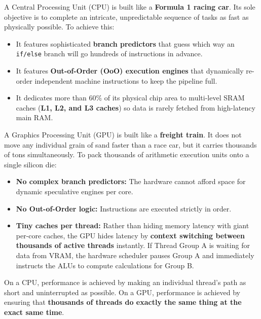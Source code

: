 \documentclass[a4paper,11pt]{article}
\begin{document}
A Central Processing Unit (CPU) is built like a \textbf{Formula 1 racing car}. Its sole objective is to complete an intricate, unpredictable sequence of tasks as fast as physically possible. To achieve this:
\begin{itemize}[leftmargin=1.5em]
  \item It features sophisticated \textbf{branch predictors} that guess which way an \texttt{if/else} branch will go hundreds of instructions in advance.
  \item It features \textbf{Out-of-Order (OoO) execution engines} that dynamically re-order independent machine instructions to keep the pipeline full.
  \item It dedicates more than $60\%$ of its physical chip area to multi-level SRAM caches (\textbf{L1, L2, and L3 caches}) so data is rarely fetched from high-latency main RAM.
\end{itemize}

A Graphics Processing Unit (GPU) is built like a \textbf{freight train}. It does not move any individual grain of sand faster than a race car, but it carries thousands of tons simultaneously. To pack thousands of arithmetic execution units onto a single silicon die:
\begin{itemize}[leftmargin=1.5em]
  \item \textbf{No complex branch predictors:} The hardware cannot afford space for dynamic speculative engines per core.
  \item \textbf{No Out-of-Order logic:} Instructions are executed strictly in order.
  \item \textbf{Tiny caches per thread:} Rather than hiding memory latency with giant per-core caches, the GPU hides latency by \textbf{context switching between thousands of active threads} instantly. If Thread Group A is waiting for data from VRAM, the hardware scheduler pauses Group A and immediately instructs the ALUs to compute calculations for Group B.
\end{itemize}

\begin{conceptbox}
On a CPU, performance is achieved by making an individual thread's path as short and uninterrupted as possible. On a GPU, performance is achieved by ensuring that \textbf{thousands of threads do exactly the same thing at the exact same time}.
\end{conceptbox}

\newpage

\end{document}
